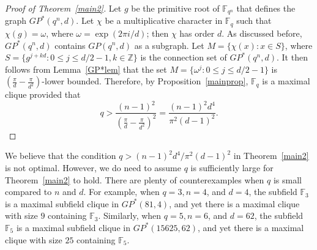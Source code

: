 \documentclass[Unicode,ALCO,published]{cedram}
\newcommand{\Z}{\mathbb{Z}}
\newcommand{\F}{\mathbb{F}}
\begin{document}
\begin{proof}[Proof of Theorem~\ref{main2}]
Let $g$ be the primitive root of $\F_{q^n}$ that defines the graph $GP^*(q^n,d)$. Let $\chi$ be a multiplicative character in $\F_q$ such that $\chi(g)=\omega$, where $\omega=\exp(2\pi i/d)$; then $\chi$ has order $d$. As discussed before, $GP^*(q^n,d)$ contains $GP(q^n,d)$ as a subgraph.  Let $M=\{\chi(x): x \in S\}$, where $S=\{g^{j+kd}: 0 \leq j \leq d/2-1, k \in \Z\}$ is the connection set of $GP^*(q^n,d)$. It then follows from Lemma~\ref{GP*lem} that the set $M=\{\omega^j :0 \leq j \leq d/2-1\}$ is $\left(\frac{\pi}{d}-\frac{\pi}{d^2}\right)$-lower bounded. Therefore, by Proposition~\ref{mainprop}, $\F_q$ is a maximal clique provided that
$$
q>\frac{(n-1)^2}{\left(\frac{\pi}{d}-\frac{\pi}{d^2}\right)^2}=\frac{(n-1)^2d^4}{\pi^2(d-1)^2}.
$$
\end{proof}
\begin{rema}\rm
We believe that the condition $q>(n-1)^2d^4/\pi^2(d-1)^2$ in Theorem~\ref{main2} is not optimal. However, we do need to assume $q$ is sufficiently large for Theorem~\ref{main2} to hold. There are plenty of counterexamples when $q$ is small compared to $n$ and $d$. For example, when $q=3,n=4$, and $d=4$, the subfield $\F_3$ is a maximal subfield clique in $GP^*(81,4)$, and yet there is a maximal clique with size $9$ containing $\F_3$. Similarly, when $q=5,n=6$, and $d=62$, the subfield $\F_5$ is a maximal subfield clique in $GP^*(15625,62)$, and yet there is a maximal clique with size $25$ containing $\F_5$.
\end{rema}




\end{document}

